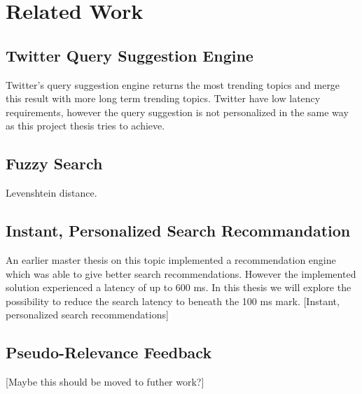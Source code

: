 \chapter{Related Work}
\label{ch:related-work}

\section{Twitter Query Suggestion Engine}

Twitter’s query suggestion engine \cite{twitter-suggestion} returns the most trending topics and merge this result with more long term trending topics.
Twitter have low latency requirements, however the query suggestion is not personalized in the same way as this project thesis tries to achieve.

\section{Fuzzy Search}
Levenshtein distance.

\section{Instant, Personalized Search Recommandation}
An earlier master thesis on this topic implemented a recommendation engine which was able to give better search recommendations.
However the implemented solution experienced a latency of up to 600 ms.
In this thesis we will explore the possibility to reduce the search latency to beneath the 100 ms mark. [Instant, personalized search recommendations]

\section{Pseudo-Relevance Feedback}
[Maybe this should be moved to futher work?]
